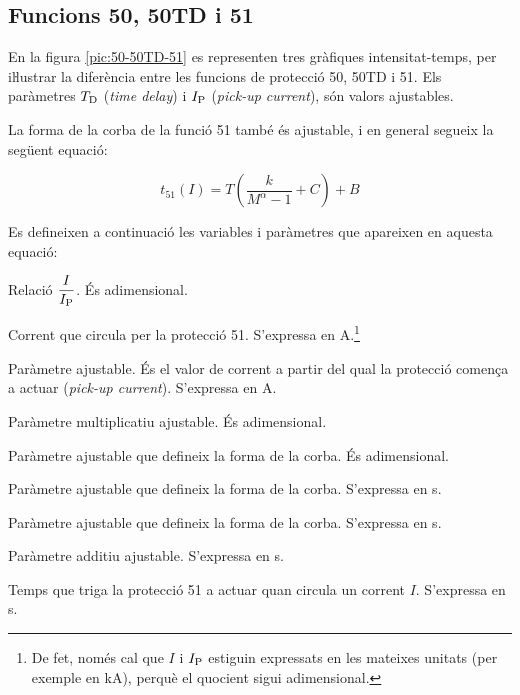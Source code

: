 \subsection{Funcions 50, 50TD i 51}

En la figura \vref{pic:50-50TD-51} es representen tres gràfiques intensitat-temps, per iŀlustrar la diferència entre les funcions de protecció 50, 50TD i 51. Els paràmetres $T_\mathrm{D}$ (\textit{time delay}) i $I\ped{P}$ (\textit{pick-up current}), són valors ajustables.
\begin{center}
	
	\label{pic:50-50TD-51}
\end{center}

\break
La forma de la corba de la funció 51 també és ajustable, i en general segueix la següent equació:

\begin{equation}\label{eq:corba-50-51}
	t_{51}(I) = T \left( \frac{k}{M^\alpha -1} + C \right) + B
\end{equation}

Es defineixen a continuació les variables i paràmetres que apareixen en aquesta equació:
\begin{list}{}
	{\setlength{\labelwidth}{15mm} \setlength{\leftmargin}{15mm} \setlength{\labelsep}{5mm}}
	\item[$M$] Relació $\dfrac{I}{I_\mathrm{P}}$. És adimensional.
	\item[$I$] Corrent que circula per la protecció 51. S'expressa en A.\footnote{\label{fn:I-Ip}De fet, només cal que $I$ i $I\ped{P}$ estiguin expressats en les mateixes unitats (per exemple en kA), perquè el  quocient sigui adimensional.}
	\item[$I\ped{P}$] Paràmetre ajustable. És el valor de corrent a partir del qual la  protecció comença a actuar (\textit{pick-up current}). S'expressa en A.
	\item[$T$] Paràmetre multiplicatiu ajustable. És adimensional.
	\item[$\alpha$] Paràmetre ajustable que defineix la forma de la corba. És adimensional.
	\item[$k$] Paràmetre ajustable que defineix la forma de la corba. S'expressa en s.
	\item[$C$] Paràmetre ajustable que defineix la forma de la corba. S'expressa en s.
	\item[$B$] Paràmetre additiu ajustable. S'expressa en s.
	\item[$t_{51}(I)$] Temps que triga la protecció 51 a actuar quan circula un corrent $I$. S'expressa en s.
\end{list}

